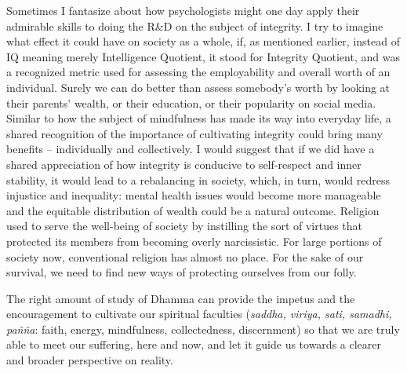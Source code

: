Sometimes I fantasize about how psychologists might one day apply their
admirable skills to doing the R\&D on the subject of integrity. I try to
imagine what effect it could have on society as a whole, if, as
mentioned earlier, instead of IQ meaning merely Intelligence Quotient,
it stood for Integrity Quotient, and was a recognized metric used for
assessing the employability and overall worth of an individual. Surely
we can do better than assess somebody's worth by looking at their
parents' wealth, or their education, or their popularity on social
media. Similar to how the subject of mindfulness has made its way into
everyday life, a shared recognition of the importance of cultivating
integrity could bring many benefits -- individually and collectively. I
would suggest that if we did have a shared appreciation of how integrity
is conducive to self-respect and inner stability, it would lead to a
rebalancing in society, which, in turn, would redress injustice and
inequality: mental health issues would become more manageable and the
equitable distribution of wealth could be a natural outcome. Religion
used to serve the well-being of society by instilling the sort of
virtues that protected its members from becoming overly narcissistic.
For large portions of society now, conventional religion has almost no
place. For the sake of our survival, we need to find new ways of
protecting ourselves from our folly.

The right amount of study of Dhamma can provide the impetus and the
encouragement to cultivate our spiritual faculties (\emph{saddha,
viriya, sati, samadhi, pañña}: faith, energy, mindfulness,
collectedness, discernment) so that we are truly able to meet our
suffering, here and now, and let it guide us towards a clearer and
broader perspective on reality.

